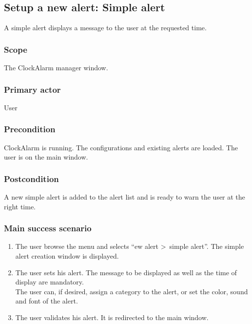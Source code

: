 \subsection{Setup a new alert: Simple alert}
A simple alert displays a message to the user at the requested time.
\subsubsection{Scope}
The ClockAlarm manager window.
\subsubsection{Primary actor}
User
\subsubsection{Precondition}
ClockAlarm is running. The configurations and existing alerts are loaded. The user is on the main window.
\subsubsection{Postcondition}
A new simple alert is added to the alert list and is ready to warn the user at the right time.
\subsubsection{Main success scenario}
\begin{enumerate}
	\item The user browse the menu and selects ``ew alert \textgreater~simple alert''. The simple alert creation window is displayed. 
	\item\label{itm:ucaa_enter_sa} The user sets his alert. The message to be displayed as well as the time of display are mandatory. \\The user can, if desired, assign a category to the alert, or set the color, sound and font of the alert.
	\item\label{itm:ucaa_validate_sa} The user validates his alert. It is redirected to the main window.
\end{enumerate}
